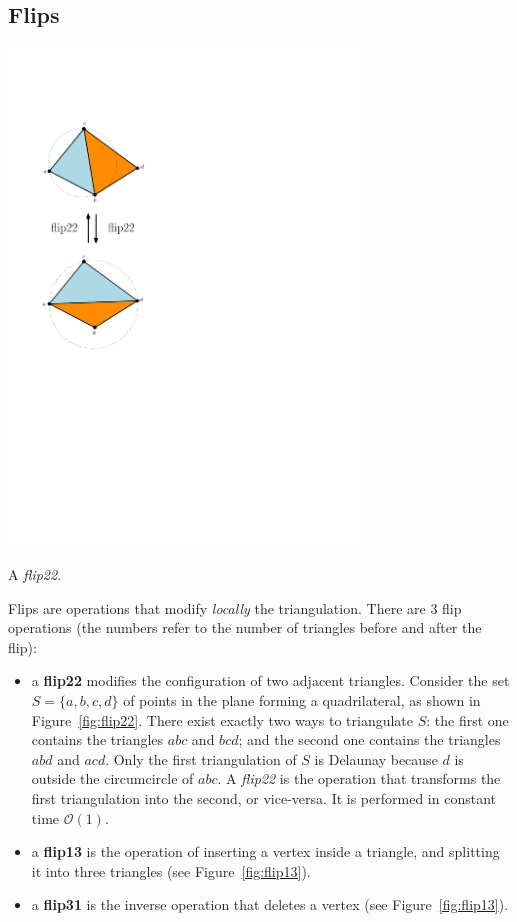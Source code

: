 \subsection{Flips}
\begin{marginfigure}
  \centering
  \includegraphics[width=0.7\textwidth]{flip22}
  \caption{A \emph{flip22}.}%
\label{fig:flip22}
\end{marginfigure}
Flips are operations that modify \emph{locally} the triangulation.
There are 3 flip operations (the numbers refer to the number of triangles before and after the flip):
\begin{itemize}
  \item a \textbf{flip22} modifies the configuration of two adjacent triangles. 
  Consider the set $S = \{a, b, c, d\}$ of points in the plane forming a quadrilateral, as shown in Figure~\ref{fig:flip22}. 
  There exist exactly two ways to triangulate $S$: the first one contains the triangles $abc$ and $bcd$; and the second one contains the triangles $abd$ and $acd$. 
  Only the first triangulation of $S$ is Delaunay because $d$ is outside the circumcircle of $abc$. 
  A \emph{flip22} is the operation that transforms the first triangulation into the second, or vice-versa.
  It is performed in constant time $\mathcal{O}(1)$.
  \item a \textbf{flip13} is the operation of inserting a vertex inside a triangle, and splitting it into three triangles (see Figure~\ref{fig:flip13}).
  \item a \textbf{flip31} is the inverse operation that deletes a vertex (see Figure~\ref{fig:flip13}).
\end{itemize}
